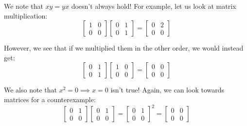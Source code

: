 \documentclass[openany]{book}
\begin{document}
\begin{warn}
	We note that $xy = yx$ doesn't always hold! For example, let us look at matrix multiplication:
	\begin{equation*}
		\begin{bmatrix}
			1 & 0 \\
			0 & 0
		\end{bmatrix}
		\begin{bmatrix}
			0 & 1 \\ 0 & 1
		\end{bmatrix} =
		\begin{bmatrix}
			0 & 2 \\ 0 & 0
		\end{bmatrix}
	\end{equation*}

	However, we see that if we multiplied them in the other order, we would instead get:
	\begin{equation*}
		\begin{bmatrix}
			0 & 1 \\ 0 & 1
		\end{bmatrix}\begin{bmatrix}
		1 & 0 \\
		0 & 0
	\end{bmatrix} =
		\begin{bmatrix}
			0 & 0 \\ 0 & 0
		\end{bmatrix}
	\end{equation*}
\end{warn}

\begin{warn}
	We also note that $x^{2} = 0 \implies x = 0$ isn't true! Again, we can look towards matrices for a counterexample:
	\begin{equation*}
		\begin{bmatrix}
			0 & 1 \\ 0 & 0
		\end{bmatrix}\begin{bmatrix}
		0 & 1 \\ 0 & 0
	\end{bmatrix} = \begin{bmatrix}
	0 & 1 \\ 0 & 0
\end{bmatrix}^{2} = \begin{bmatrix}
	0 & 0 \\ 0 & 0
\end{bmatrix}
	\end{equation*}
\end{warn}
\end{document}
